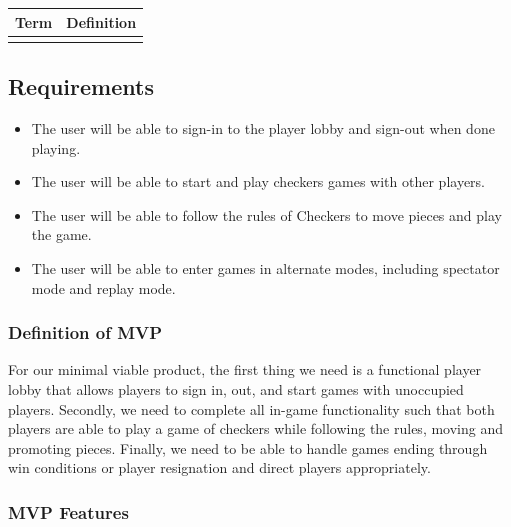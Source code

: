 \documentclass[]{article}
\providecommand{\tightlist}{%
  \setlength{\itemsep}{0pt}\setlength{\parskip}{0pt}}
\begin{document}
\begin{longtable}[]{@{}ll@{}}
\toprule
Term & Definition\tabularnewline
\midrule
\endhead
&\tabularnewline
\bottomrule
\end{longtable}

\hypertarget{requirements}{%
\subsection{Requirements}\label{requirements}}

\begin{itemize}
\tightlist
\item
  The user will be able to sign-in to the player lobby and sign-out when
  done playing.
\item
  The user will be able to start and play checkers games with other
  players.
\item
  The user will be able to follow the rules of Checkers to move pieces
  and play the game.
\item
  The user will be able to enter games in alternate modes, including
  spectator mode and replay mode.
\end{itemize}

\hypertarget{definition-of-mvp}{%
\subsubsection{Definition of MVP}\label{definition-of-mvp}}

For our minimal viable product, the first thing we need is a functional
player lobby that allows players to sign in, out, and start games with
unoccupied players. Secondly, we need to complete all in-game
functionality such that both players are able to play a game of checkers
while following the rules, moving and promoting pieces. Finally, we need
to be able to handle games ending through win conditions or player
resignation and direct players appropriately.

\hypertarget{mvp-features}{%
\subsubsection{MVP Features}\label{mvp-features}}
\end{document}

